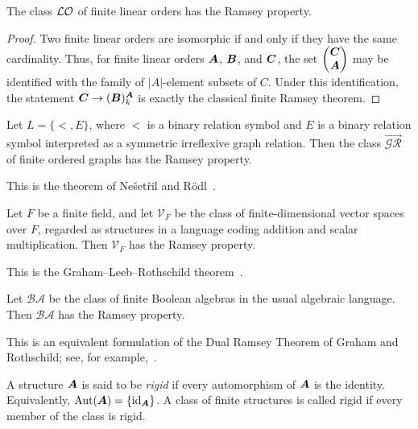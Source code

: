 \begin{example}
    The class \(\mathcal{LO}\) of finite linear orders has the Ramsey property.
\end{example}

\begin{proof}
    Two finite linear orders are isomorphic if and only if they have the same cardinality. Thus, for finite linear orders \(\boldsymbol{A}\), \(\boldsymbol{B}\), and \(\boldsymbol{C}\), the set
    \(\begin{pmatrix} \boldsymbol{C} \\ \boldsymbol{A} \end{pmatrix}\) may be identified with the family of \(|A|\)-element subsets of \(C\). Under this identification, the statement \(\boldsymbol{C} \to (\boldsymbol{B})^{\boldsymbol{A}}_k\) is exactly the classical finite Ramsey theorem.
\end{proof}

\begin{example}
    Let \(L=\{<,E\}\), where \(<\) is a binary relation symbol and \(E\) is a binary relation symbol interpreted as a symmetric irreflexive graph relation. Then the class \(\vec{\mathcal{GR}}\) of finite ordered graphs has the Ramsey property.
\end{example}

This is the theorem of Ne\v{s}et\v{r}il and R\"odl~\cite{NR77,NR83}.

\begin{example}
    Let \(F\) be a finite field, and let \(\mathcal{V}_F\) be the class of finite-dimensional vector spaces over \(F\), regarded as structures in a language coding addition and scalar multiplication. Then \(\mathcal{V}_F\) has the Ramsey property.
\end{example}

This is the Graham--Leeb--Rothschild theorem~\cite{GLR}.

\begin{example}
    Let \(\mathcal{BA}\) be the class of finite Boolean algebras in the usual algebraic language. Then \(\mathcal{BA}\) has the Ramsey property.
\end{example}

This is an equivalent formulation of the Dual Ramsey Theorem of Graham and Rothschild; see, for example,~\cite[\S 4.13]{N95}.

\begin{definition}
    A structure \(\boldsymbol{A}\) is said to be \emph{rigid} if every automorphism of \(\boldsymbol{A}\) is the identity. Equivalently, \(\operatorname{Aut}(\boldsymbol{A})=\{\operatorname{id}_{\boldsymbol{A}}\}\).
    A class of finite structures is called rigid if every member of the class is rigid.
\end{definition}

